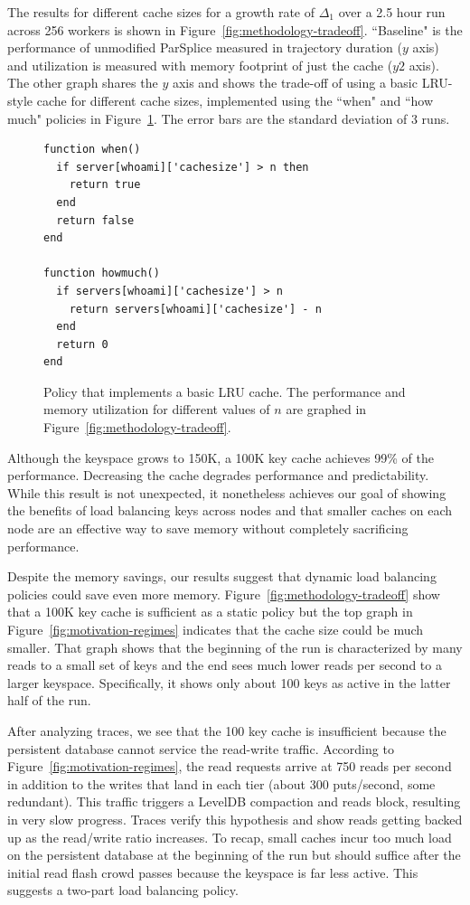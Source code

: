 The results for different cache sizes for a growth rate of \(\Delta_1\) over a
2.5 hour run across 256 workers is shown in
Figure~\ref{fig:methodology-tradeoff}.  ``Baseline" is the performance of
unmodified ParSplice  measured in trajectory duration (\(y\) axis) and
utilization is measured with memory footprint of just the cache (\(y2\) axis).
The other graph shares the \(y\) axis and shows the trade-off of using a basic
LRU-style cache for different cache sizes, implemented using the ``when" and
``how much" policies in Figure~\ref{src:lru}.  The error bars are the standard
deviation of 3 runs. 

\begin{figure}[t]
\footnotesize
\centering
\begin{verbatim}
function when()
  if server[whoami]['cachesize'] > n then
    return true
  end
  return false
end

function howmuch()
  if servers[whoami]['cachesize'] > n
    return servers[whoami]['cachesize'] - n
  end
  return 0
end
\end{verbatim}
\caption{Policy that implements a basic LRU cache. The performance and memory
utilization for different values of \(n\) are graphed in
Figure~\ref{fig:methodology-tradeoff}.
\label{src:lru}}
\end{figure}

Although the keyspace grows to 150K, a 100K key cache achieves 99\% of the
performance. Decreasing the cache degrades performance and predictability.
While this result is not unexpected, it nonetheless achieves our goal of
showing the benefits of load balancing keys across nodes and that smaller
caches on each node are an effective way to save memory without completely
sacrificing performance.

Despite the memory savings, our results suggest that dynamic load balancing
policies could save even more memory.  Figure~\ref{fig:methodology-tradeoff}
show that a 100K key cache is sufficient as a static policy but the top graph
in Figure~\ref{fig:motivation-regimes} indicates that the cache size could be
much smaller. That graph shows that the beginning of the run is characterized
by many reads to a small set of keys and the end sees much lower reads per
second to a larger keyspace. Specifically, it shows only about 100 keys as
active in the latter half of the run.

After analyzing traces, we see that the 100 key cache is insufficient because
the persistent database cannot service the read-write traffic.  According to
Figure~\ref{fig:motivation-regimes}, the read requests arrive at 750 reads per
second in addition to the writes that land in each tier (about 300 puts/second,
some redundant). This traffic triggers a LevelDB compaction and reads block,
resulting in very slow progress.  Traces verify this hypothesis and show reads
getting backed up as the read/write ratio increases. To recap, small caches
incur too much load on the persistent database  at the beginning of the run but
should suffice after the initial read flash crowd passes because
the keyspace is far less active. This suggests a two-part load balancing
policy.

